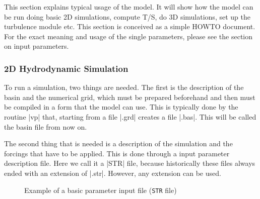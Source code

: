
%
%
%
%
%
%
%

This section explains typical usage of the model. It will show how the
model can be run doing basic 2D simulations, compute T/S, do 3D simulations,
set up the turbulence module etc. This section is conceived as
a simple HOWTO document. For the exact meaning and usage of the single
parameters, please see the section on input parameters.

\subsubsection{2D Hydrodynamic Simulation}

To run a simulation, two things are needed. The first is the description
of the basin and the numerical grid, which must be prepared beforehand
and then must be compiled in a form that the model can use. This is typically
done by the routine |vp| that, starting from a file |.grd| creates a file
|.bas|. This will be called the basin file from now on.

The second thing that is needed is a description of the simulation and
the forcings that have to be applied. This is done through a 
input parameter description file. Here we call it a |STR| file, because
historically these files always ended with an extension of |.str|. However,
any extension can be used.

\begin{figure}
\begin{alltt}

\end{alltt}
\caption{Example of a basic parameter input file ({\tt STR} file)}
\label{fig:str_basic}
\end{figure}


